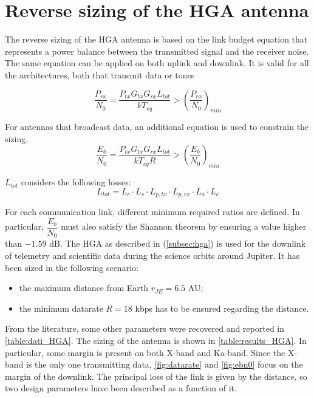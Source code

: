 \section{Reverse sizing of the HGA antenna}
\label{sec:HGA_sizing}

The reverse sizing of the HGA antenna is based on the link budget equation that represents a power balance between the transmitted signal and the receiver noise. The same equation can be applied on both uplink and downlink. It is valid for all the architectures, both that transmit data or tones

\begin{equation}
    \dfrac{P_{rx}}{N_0} = \dfrac{P_{tx} G_{tx} G_{rx} L_{tot}}{k T_{eq}} > \left( \dfrac{P_{rx}}{N_0} \right)_{min}
\end{equation}

For antennas that broadcast data, an additional equation is used to constrain the sizing.
\begin{equation}
    \dfrac{E_b}{N_0} = \dfrac{P_{tx} G_{tx} G_{rx} L_{tot}}{k T_{eq} R} > \left( \dfrac{E_b}{N_0} \right)_{min}
\end{equation}

$L_{tot}$ considers the following losses:
\begin{equation}
    L_{tot} = L_{c} \cdot L_{s} \cdot L_{p,tx} \cdot L_{p,rx} \cdot L_{a} \cdot L_{c}
\end{equation}

For each communication link, different minimum required ratios are defined. In particular, $\dfrac{E_b}{N_0}$ must also satisfy the Shannon theorem by ensuring a value higher than $-1.59$ dB. 
The HGA as described in (\autoref{subsec:hga}) is used for the downlink of telemetry and scientific data during the science orbits around Jupiter. It has been sized in the following scenario: 
\begin{itemize}
    \item the maximum distance from Earth $r_{JE} = 6.5$ AU;
    \item the minimum datarate $R = 18$ kbps has to be ensured regarding the distance.
\end{itemize}

From the literature, some other parameters were recovered and reported in \autoref{table:dati_HGA}. The sizing of the antenna is shown in \autoref{table:results_HGA}. In particular, some margin is present on both X-band and Ka-band. Since the X-band is the only one transmitting data, \autoref{fig:datarate} and \autoref{fig:ebn0} focus on the margin of the downlink. The principal loss of the link is given by the distance, so two design parameters have been described as a function of it. 

